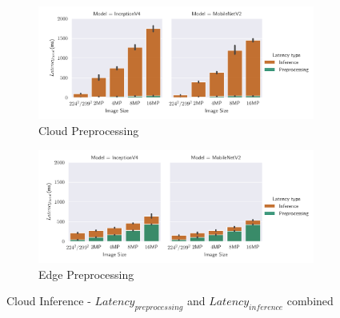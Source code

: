 \begin{figure}[H]
\centering
\begin{subfigure}[b]{0.95\textwidth}
   \includegraphics[width=1\linewidth]{./Bilder/single_plots/cloud_inference_plots/Cloud_Preprocessing_Inference_Comb_cloud_prepro.pdf}
   \caption{Cloud Preprocessing}
   \label{fig:CloudInference+PreproCloud} 
\end{subfigure}

\begin{subfigure}[b]{0.95\textwidth}
   \includegraphics[width=1\linewidth]{./Bilder/single_plots/cloud_inference_plots/Cloud_Preprocessing_Inference_Comb_edge_prepro.pdf}
   \caption{Edge Preprocessing}
   \label{fig:CloudInference+PreproEdge}
\end{subfigure}

\caption{Cloud Inference -  $Latency_{preprocessing}$ and $Latency_{inference}$ combined}
\end{figure}



